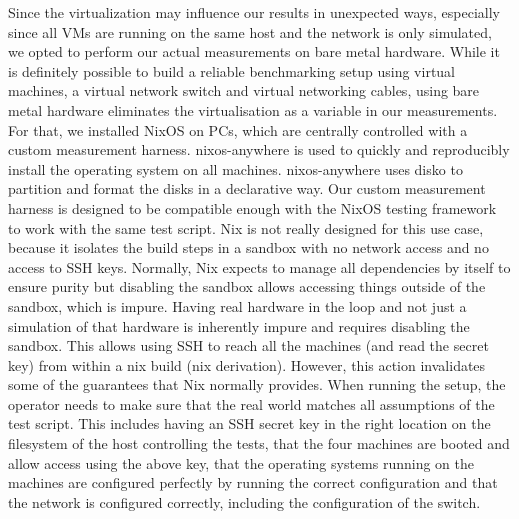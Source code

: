 Since the virtualization may influence our results in unexpected ways, especially since all VMs are running on the same host and the network is only simulated, we opted to perform our actual measurements on bare metal hardware.
While it is definitely possible to build a reliable benchmarking setup using virtual machines, a virtual network switch and virtual networking cables, using bare metal hardware eliminates the virtualisation as a variable in our measurements.
For that, we installed NixOS on PCs, which are centrally controlled with a custom measurement harness.
nixos-anywhere \cite{nixos-anywhere} is used to quickly and reproducibly install the operating system on all machines.
nixos-anywhere uses disko \cite{disko} to partition and format the disks in a declarative way.
Our custom measurement harness is designed to be compatible enough with the NixOS testing framework to work with the same test script.
Nix is not really designed for this use case, because it isolates the build steps in a sandbox with no network access and no access to SSH keys.
Normally, Nix expects to manage all dependencies by itself to ensure purity but disabling the sandbox allows accessing things outside of the sandbox, which is impure.
Having real hardware in the loop and not just a simulation of that hardware is inherently impure and requires disabling the sandbox.
This allows using SSH to reach all the machines (and read the secret key) from within a nix build (nix derivation).
However, this action invalidates some of the guarantees that Nix normally provides.
When running the setup, the operator needs to make sure that the real world matches all assumptions of the test script.
This includes having an SSH secret key in the right location on the filesystem of the host controlling the tests, that the four machines are booted and allow access using the above key, that the operating systems running on the machines are configured perfectly by running the correct configuration and that the network is configured correctly, including the configuration of the switch.

